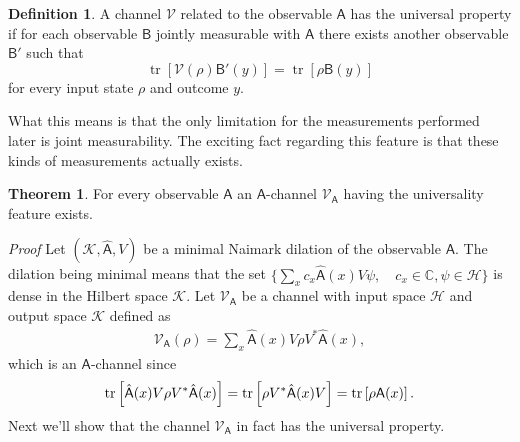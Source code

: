 \documentclass[a4paper,12pt]{wihuri}
\theoremstyle{definition}
\newtheorem{definition}{Definition}
\newtheorem{theorem}{Theorem}
\numberwithin{definition}{section}
\numberwithin{example}{section}
\numberwithin{theorem}{section}
\numberwithin{proposition}{section}
\numberwithin{lemma}{section}
\newcommand{\hi}{\mathcal{H}}%
\newcommand{\ki}{\mathcal{K}}%
\newcommand{\V}{\mathcal{V}}%
\newcommand{\A}{\mathsf{A}}%
\newcommand{\B}{\mathsf{B}}%
\DeclareMathOperator{\tr}{tr}
\begin{document}
\begin{definition}
A channel $\V$ related to the observable $\A$ has the universal property if for each observable $\B$ jointly measurable with $\A$ there exists another observable $\B'$ such that
\begin{equation}\label{universality_joint}
\tr[\V(\rho)\B'(y)] = \tr[\rho\B(y)]
\end{equation}
for every input state $\rho$ and outcome $y$.
\end{definition}
What this means is that the only limitation for the measurements performed later is joint measurability. The exciting fact regarding this feature is that these kinds of measurements actually exists\cite{heinosaari_miyadera_universality}.
\begin{theorem}
For every observable $\A$ an $\A$-channel $\V_{\A}$ having the universality feature exists.
\end{theorem}


\noindent \textit{Proof} Let $(\ki, \hat{\A}, V)$ be a minimal Naimark dilation of the observable $\A$. The dilation being minimal means that the set $\lbrace \sum_x c_x\hat{\A}(x)V\psi, \quad c_x\in \mathbb{C}, \psi \in \hi \rbrace$ is dense in the Hilbert space $\ki$. Let $\V_{\A}$ be a channel with input space $\hi$ and output space $\ki$ defined as 
\begin{align*}
\V_{\A}(\rho) = \sum_x\hat{\A}(x)V\rho V^*\hat{\A}(x),
\end{align*}
which is an $\A$-channel since
\begin{align*}
\tr\left[\hat{\A}(x)V\rho V^*\hat{\A}(x)\right] = \tr\left[\rho V^* \hat{\A}(x)V \right] = \tr\left[\rho\A(x) \right]\text.
\end{align*}
Next we'll show that the channel $\V_{\A}$ in fact has the universal property.
\end{document}
